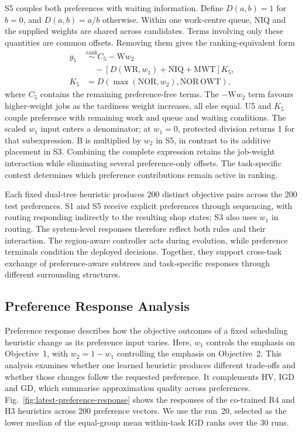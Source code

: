 \documentclass[10pt,journal]{IEEEtran}
\begin{document}
S5 couples both preferences with waiting information. Define $D(a,b)=1$ for $b=0$, and $D(a,b)=a/b$ otherwise. Within one work-centre queue, NIQ and the supplied weights are shared across candidates. Terms involving only these quantities are common offsets. Removing them gives the ranking-equivalent form
\begin{equation}
\begin{aligned}
g_5&\overset{\mathrm{rank}}{\sim}
C_5-\mathrm{W}w_2\\
&\quad-[D(\mathrm{WR},w_1)+\mathrm{NIQ}+\mathrm{MWT}]K_5,\\
K_5&=D\!\left(\max(\mathrm{NOR},w_2),\mathrm{NOR}\,\mathrm{OWT}\right),
\end{aligned}
\label{eq:case-tree-s5}
\end{equation}
where $C_5$ contains the remaining preference-free terms. The $-\mathrm{W}w_2$ term favours higher-weight jobs as the tardiness weight increases, all else equal. U5 and $K_5$ couple preference with remaining work and queue and waiting conditions. The scaled $w_1$ input enters a denominator; at $w_1=0$, protected division returns 1 for that subexpression. B is multiplied by $w_2$ in S5, in contrast to its additive placement in S3. Combining the complete expression retains the job-weight interaction while eliminating several preference-only offsets. The task-specific context determines which preference contributions remain active in ranking.

Each fixed dual-tree heuristic produces 200 distinct objective pairs across the 200 test preferences. S1 and S5 receive explicit preferences through sequencing, with routing responding indirectly to the resulting shop states; S3 also uses $w_1$ in routing. The system-level responses therefore reflect both rules and their interaction. The region-aware controller acts during evolution, while preference terminals condition the deployed decisions. Together, they support cross-task exchange of preference-aware subtrees and task-specific responses through different surrounding structures.

\subsection{Preference Response Analysis}
Preference response describes how the objective outcomes of a fixed scheduling heuristic change as its preference input varies. Here, $w_1$ controls the emphasis on Objective~1, with $w_2=1-w_1$ controlling the emphasis on Objective~2. This analysis examines whether one learned heuristic produces different trade-offs and whether those changes follow the requested preference. It complements HV, IGD and GD, which summarise approximation quality across preferences. Fig.~\ref{fig:latest-preference-response} shows the responses of the co-trained R4 and H3 heuristics across 200 preference vectors. We use the run~20, selected as the lower median of the equal-group mean within-task IGD ranks over the 30 runs.
\end{document}
